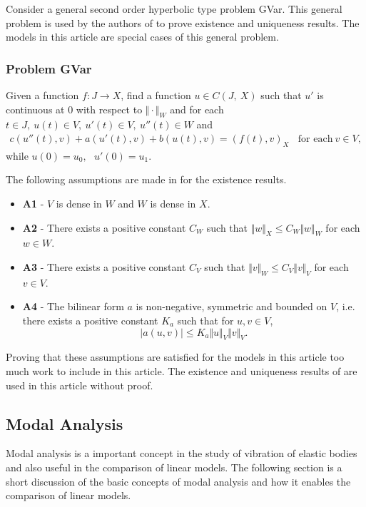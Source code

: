 		Consider a general second order hyperbolic type problem GVar. This general problem is used by the 
		authors of \cite{VV02} to prove existence and uniqueness results. The models in this article are 
		special cases of this general problem.

		\subsubsection*{Problem GVar}\label{sssec:existence:ProblemGVar}
		Given a function $f:J\rightarrow X$, find a function $u\in C(J,\ X)$ such that $u'$ is continuous at $0$ with respect to $\Vert \cdot \Vert_{W}$ and for each $t\in J,\ u(t)\in V,\ u'(t) \in V,\ u''(t)\in W$ and
		\begin{eqnarray}
			c(u''(t),v)+a(u'(t),v)+b(u(t),v)= (f(t),v)_{X} \ \ \ \ \textrm{for each} \ v \in V, \label{eq:existence:ProblemGVar}
		\end{eqnarray}
		while $u(0)=u_{0},\ \ \ u'(0)=u_{1}$.


		The following assumptions are made in \cite{VV02} for the existence results.
		\begin{itemize}
			\item[] \textbf{A1} - $V$ is dense in $W$ and $W$ is dense in $X$.

			\item[] \textbf{A2} - There exists a positive constant $C_{W}$ such that $\Vert w\Vert_{X} \leq C_{W}\Vert w\Vert_{W}$ for each $ w\in W$.

			\item[] \textbf{A3} - There exists a positive constant $C_{V}$ such that $\Vert v\Vert_{W} \leq C_{V}\Vert v\Vert_{V}$ for each $v \in V$.

			\item[] \textbf{A4} - The bilinear form $a$ is non-negative, symmetric and bounded on $V$, i.e. there exists a positive constant $K_a$ such that for $\displaystyle u,v \in V$, \[|a(u,v)| \leq K_a\Vert u \Vert_V \Vert v \Vert_V.\]
		\end{itemize}

		Proving that these assumptions are satisfied for the models in this article too much work to include in this article. The existence and uniqueness results of \cite{VV02} are used in this article without proof.

	\subsection*{Modal Analysis}
		Modal analysis is a important concept in the study of vibration of elastic bodies and also useful in the comparison of linear models. The following section is a short discussion of the basic concepts of modal analysis and how it enables the comparison of linear models.

